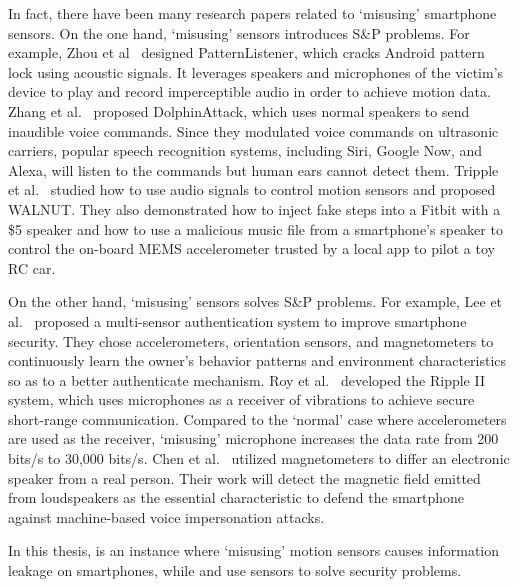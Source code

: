 In fact, there have been many research papers related to `misusing' smartphone sensors. On the one hand, `misusing' sensors introduces S\&P problems. For example, Zhou et al~\cite{zhou2018patternlistener} designed PatternListener, which cracks Android pattern lock using acoustic signals. It leverages speakers and microphones of the victim's device to play and record imperceptible audio in order to achieve motion data.
Zhang et al.~\cite{zhang2017dolphinattack} proposed DolphinAttack, which uses normal speakers to send inaudible voice commands. Since they modulated voice commands on ultrasonic carriers, popular speech recognition systems, including Siri, Google Now, and Alexa, will listen to the commands but human ears cannot detect them. Tripple et al.~\cite{trippel2017walnut} studied how to use audio signals to control motion sensors and proposed WALNUT. They also demonstrated how to inject fake steps into a Fitbit with a \$5 speaker and how to use a malicious music file from a smartphone's speaker to control the on-board MEMS accelerometer trusted by a local app to pilot a toy RC car. 

On the other hand, `misusing' sensors solves S\&P problems. 
For example, Lee et al.~\cite{lee2015multi} proposed a multi-sensor authentication system to improve smartphone security. They chose accelerometers, orientation sensors, and magnetometers to continuously learn the owner's behavior patterns and environment characteristics so as to a better authenticate mechanism. 
Roy et al.~\cite{roy2016ripple} developed the Ripple II system, which uses microphones as a receiver of vibrations to achieve secure short-range communication. Compared to the `normal' case where accelerometers are used as the receiver, `misusing' microphone increases the data rate from  200 bits/s to 30,000 bits/s.  
Chen et al.~\cite{chen2017you} utilized magnetometers to differ an electronic speaker from a real person. Their work will detect the magnetic field emitted from loudspeakers as the essential characteristic to defend the smartphone against machine-based voice impersonation attacks.

In this thesis, {\spp} is an instance where `misusing' motion sensors causes information leakage on smartphones, while {\uu} and {\mv} use sensors to solve security problems. 

